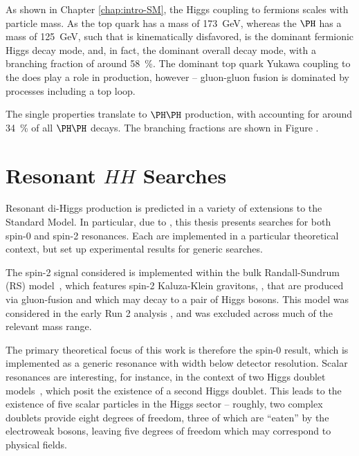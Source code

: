 As shown in Chapter \ref{chap:intro-SM}, the Higgs coupling to fermions scales with particle mass. 
As the top quark has a mass of \SI{173}{\GeV}, whereas the $\higgs$ has a mass of \SI{125}{\GeV}, such that 
\HepProcess{\higgs \to \Pqt\Paqt} is kinematically disfavored, \HepProcess{\higgs \to \Pqb\Paqb} is the dominant 
fermionic Higgs decay mode, and, in fact, 
the dominant overall decay mode, with a branching fraction of around 58~\%. The dominant top quark Yukawa coupling to 
the \higgs does play a role in \higgs production, however -- gluon-gluon fusion is dominated by processes including 
a top loop.

The single \higgs properties translate to $\higgs\higgs$ production, with \HepProcess{\higgs\higgs \to \bbbb} accounting
for around 34~\% of all $\higgs\higgs$ decays. The \higgs\higgs branching fractions are shown in Figure .

\section{Resonant $HH$ Searches}
Resonant di-Higgs production is predicted in a variety of extensions to the
Standard Model. In particular, due to , this thesis presents
searches for both spin-0 and spin-2 resonances. Each are implemented in a particular 
theoretical context, but set up experimental results for generic searches.

The spin-2 signal considered is implemented within the bulk Randall-Sundrum (RS)
model~\cite{Gravitons}, which features spin-2 Kaluza-Klein gravitons,
\PGrav, that are produced via gluon-fusion and which may decay to a pair of Higgs bosons.
This model was considered in the early Run 2 analysis , and was excluded 
across much of the relevant mass range. 

The primary theoretical focus of this work is therefore the spin-0 result, which 
is implemented as a generic resonance with width below detector resolution. Scalar 
resonances are interesting, for instance, in the context of two Higgs doublet models~\cite{2HDM}, which 
posit the existence of a second Higgs doublet. This leads to the existence of five scalar
particles in the Higgs sector -- roughly, two complex doublets provide eight degrees of freedom, three of 
which are ``eaten'' by the electroweak bosons, leaving five degrees of freedom which may correspond
to physical fields.


